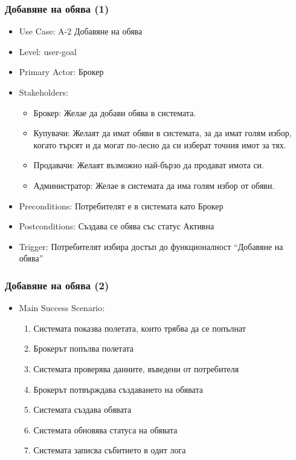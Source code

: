 \documentclass[12pt]{beamer}
\begin{document}
\begin{frame}[fragile]
\frametitle{Добавяне на обява (1)}
\begin{itemize}
	\item Use Case: A-2 Добавяне на обява
	\item Level: user-goal
	\item Primary Actor: Брокер
	\item {Stakeholders:
		\begin{itemize}
			\item Брокер: Желае да добави обява в системата.
			\item Купувачи: Желаят да имат обяви в системата, за да имат голям избор, когато търсят и да могат по-лесно да си изберат точния имот за тях.
			\item Продавачи: Желаят възможно най-бързо да продават имота си.
			\item Администратор: Желае в системата да има голям избор от обяви.	
		\end{itemize}
	}
	\item Preconditions: Потребителят е в системата като Брокер
	\item Postconditions: Създава се обява със статус Активна
	\item Trigger: Потребителят избира достъп до функционалност ``Добавяне на обява''
\end{itemize}
\end{frame}

\begin{frame}[fragile]
\frametitle{Добавяне на обява (2)}
\begin{itemize}
	\item {Main Success Scenario:
		\begin{enumerate}
	\item Системата показва полетата, които трябва да се попълнат
	\item Брокерът попълва полетата
	\item Системата проверява данните, въведени от потребителя
	\item Брокерът потвърждава създаването на обявата
	\item Системата създава обявата
	\item Системата обновява статуса на обявата
	\item Системата записва събитието в одит лога
		\end{enumerate}
	}
\end{itemize}
\end{frame}
\end{document}
